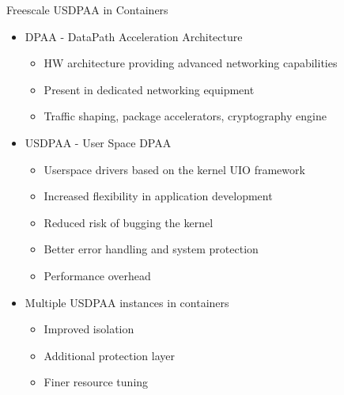\begin{frame}{Freescale USDPAA in Containers}
	\begin{itemize}
	\item DPAA - DataPath Acceleration Architecture
		\begin{itemize}
		\item HW architecture providing advanced networking capabilities
		\item Present in dedicated networking equipment
		\item Traffic shaping, package accelerators, cryptography engine
		\end{itemize}
	\item USDPAA - User Space DPAA
		\begin{itemize}
		\item Userspace drivers based on the kernel UIO framework
		\item Increased flexibility in application development
		\item Reduced risk of bugging the kernel
		\item Better error handling and system protection
		\item Performance overhead
		\end{itemize}
	\item Multiple USDPAA instances in containers
		\begin{itemize}
		\item Improved isolation
		\item Additional protection layer
		\item Finer resource tuning
		\end{itemize}
	\end{itemize}
\end{frame}
